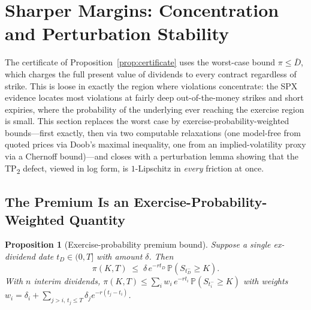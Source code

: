 \documentclass[11pt]{article}
\newtheorem{proposition}{Proposition}
\theoremstyle{remark}
\newcommand{\Prob}{\mathbb{P}}
\begin{document}
\section{Sharper Margins: Concentration and Perturbation Stability}\label{sec:concentration}

The certificate of Proposition~\ref{prop:certificate} uses the worst-case bound $\pi\le\bar D$, which charges the full present value of dividends to every contract regardless of strike. This is loose in exactly the region where violations concentrate: the SPX evidence locates most violations at fairly deep out-of-the-money strikes and short expiries, where the probability of the underlying ever reaching the exercise region is small. This section replaces the worst case by exercise-probability-weighted bounds---first exactly, then via two computable relaxations (one model-free from quoted prices via Doob's maximal inequality, one from an implied-volatility proxy via a Chernoff bound)---and closes with a perturbation lemma showing that the TP\textsubscript{2} defect, viewed in log form, is $1$-Lipschitz in \emph{every} friction at once.

\subsection{The Premium Is an Exercise-Probability-Weighted Quantity}

\begin{proposition}[Exercise-probability premium bound]\label{prop:probweight}
Suppose a single ex-dividend date $t_D\in(0,T]$ with amount $\delta$. Then
\begin{equation}
\pi(K,T)\;\le\;\delta\,e^{-rt_D}\,\Prob\!\left(S_{t_D^-}\ge K\right).
\label{eq:probweight}
\end{equation}
With $n$ interim dividends, $\pi(K,T)\le\sum_i w_i\,e^{-rt_i}\,\Prob(S_{t_i^-}\ge K)$ with weights $w_i=\delta_i+\sum_{j>i,\,t_j\le T}\delta_j e^{-r(t_j-t_i)}$.
\end{proposition}
\end{document}
